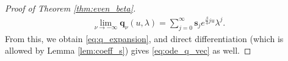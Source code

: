 \documentclass[10pt,a4paper]{amsart}
\begin{document}
\begin{proof}[Proof of Theorem \ref{thm:even_beta}]
\begin{align}\label{eq:q_nu_lim}
    \lim_{\nu\to -\infty} \mathbf{q}_{\nu}(u,\lambda)=\sum_{j=0}^\infty \mathbf{s}_j e^{\frac{\beta}{4} j u} \lambda^j.
\end{align}
From this, we obtain \eqref{eq:q_expansion}, and direct differentiation (which is allowed by Lemma \ref{lem:coeff_s}) gives \eqref{eq:ode_q_vec} as well.
\end{proof}   
\end{document}
